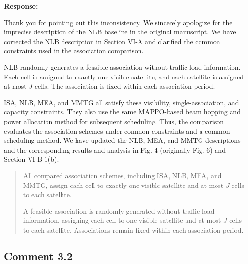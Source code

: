 \documentclass[11pt,a4paper]{article}
\begin{document}
\textbf{Response:}\par

Thank you for pointing out this inconsistency. We sincerely apologize for the imprecise description of the NLB baseline in the original manuscript. We have corrected the NLB description in Section VI-A and clarified the common constraints used in the association comparison.
\par

NLB randomly generates a feasible association without traffic-load information. Each cell is assigned to exactly one visible satellite, and each satellite is assigned at most $J$ cells. The association is fixed within each association period.
\par

ISA, NLB, MEA, and MMTG all satisfy these visibility, single-association, and capacity constraints. They also use the same MAPPO-based beam hopping and power allocation method for subsequent scheduling. Thus, the comparison evaluates the association schemes under common constraints and a common scheduling method. We have updated the NLB, MEA, and MMTG descriptions and the corresponding results and analysis in Fig. 4 (originally Fig. 6) and Section VI-B-1(b).
\par


\begin{quote}\small\color{revisionblue}
All compared association schemes, including ISA, NLB, MEA, and MMTG, assign each cell to exactly one visible satellite and at most $J$ cells to each satellite.
\par

A feasible association is randomly generated without traffic-load information, assigning each cell to one visible satellite and at most $J$ cells to each satellite. Associations remain fixed within each association period.
\par
\end{quote}


\subsection*{Comment 3.2}
\end{document}
